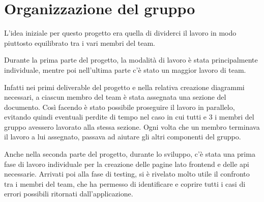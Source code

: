 \documentclass[a4paper,12pt]{article}
\begin{document}
\newpage
\section{Organizzazione del gruppo}
L'idea iniziale per questo progetto era quella di dividerci il lavoro in modo piuttosto equilibrato tra i vari membri del team.

Durante la prima parte del progetto, la modalità di lavoro è stata principalmente individuale, mentre poi nell'ultima parte c'è stato un maggior lavoro di team.

Infatti nei primi deliverable del progetto e nella relativa creazione diagrammi necessari, a ciascun membro del team è stata assegnata una sezione del documento. Così facendo è stato possibile proseguire il lavoro in parallelo, evitando quindi  eventuali perdite di tempo nel caso in cui tutti e 3 i membri del gruppo avessero lavorato alla stessa sezione. \newline
Ogni volta che un membro terminava il lavoro a lui assegnato, passava ad aiutare gli altri componenti del gruppo.

Anche nella seconda parte del progetto, durante lo sviluppo, c'è stata una prima fase di lavoro individuale per la creazione delle pagine lato frontend e delle api necessarie. \newline
Arrivati poi alla fase di testing, si è rivelato molto utile il confronto tra i membri del team, che ha permesso di identificare e coprire tutti i casi di errori possibili ritornati dall'applicazione.






\newpage
\end{document}
